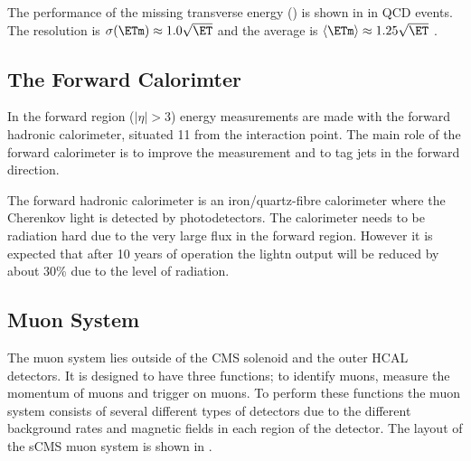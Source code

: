 The performance of the missing transverse energy (\ETm) is shown in
 in QCD events. The \ETm resolution is
$\sigma(\ETm) \approx 1.0 \sqrt \ET$ and the average \ETm is 
$\langle \ETm \rangle \approx 1.25 \sqrt \ET$ \cite{tdr}.

\subsection{The Forward Calorimter}
In the forward region ($|\eta| > 3$) energy measurements are made with the
forward hadronic calorimeter, situated \unit{11}{\meter} from the interaction
point. The main role of the forward calorimeter is to improve the \ETm
measurement and to tag jets in the forward direction.

The forward hadronic calorimeter is an iron/quartz-fibre calorimeter where the
Cherenkov light is detected by photodetectors.  The calorimeter needs to be
radiation hard due to the very large flux in the forward region. However it is
expected that after 10 years of operation the lightn output will be reduced by
about \unit{30}{\%} due to the level of radiation.

\subsection{Muon System}
The muon system lies outside of the CMS solenoid and the outer HCAL detectors.
It is designed to have three functions; to identify muons, measure the momentum
of muons and trigger on muons. To perform these functions the muon system
consists of several different types of detectors due to the different background
rates and magnetic fields in each region of the detector.
The layout of the s{CMS} muon system is shown in .

